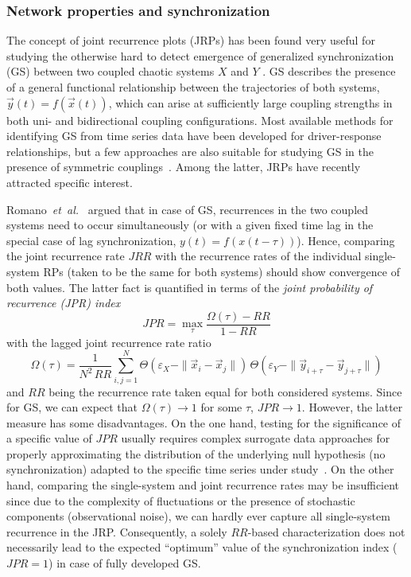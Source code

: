 		\subsubsection{Network properties and synchronization}\label{sec:JRNSsync}
		The concept of joint recurrence plots (JRPs) has been found very useful for studying the otherwise hard to detect emergence of generalized synchronization (GS) between two coupled chaotic systems $X$ and $Y$ \cite{romano2005}. GS describes the presence of a general functional relationship between the trajectories of both systems, $\vec{y}(t)=f(\vec{x}(t))$, which can arise at sufficiently large coupling strengths in both uni- and bidirectional coupling configurations. Most available methods for identifying GS from time series data have been developed for driver-response relationships, but a few approaches are also suitable for studying GS in the presence of symmetric couplings~\cite{Feldhoff2013}. Among the latter, JRPs have recently attracted specific interest.

		Romano~\textit{et~al.}~\cite{romano2005} argued that in case of GS, recurrences in the two coupled systems need to occur simultaneously (or with a given fixed time lag in the special case of lag synchronization, $y(t)=f(x(t-\tau))$). Hence, comparing the joint recurrence rate $JRR$ with the recurrence rates of the individual single-system RPs (taken to be the same for both systems) should show convergence of both values. The latter fact is quantified in terms of the \textit{joint probability of recurrence (JPR) index}
\begin{equation}
JPR = \max_{\tau} \frac{\Omega(\tau)-RR}{1-RR}
\label{eq:jpr}
\end{equation}
\noindent
with the lagged joint recurrence rate ratio
\begin{equation}
\Omega(\tau)=\frac{1}{N^2\, RR}\sum_{i,j=1}^N \Theta(\varepsilon_X-\|\vec{x}_i-\vec{x}_j\|)\, \Theta(\varepsilon_Y-\|\vec{y}_{i+\tau}-\vec{y}_{j+\tau}\|)
\end{equation}
\noindent
and $RR$ being the recurrence rate taken equal for both considered systems. Since for GS, we can expect that $\Omega(\tau)\to 1$ for some $\tau$, $JPR\to 1$. However, the latter measure has some disadvantages. On the one hand, testing for the significance of a specific value of $JPR$ usually requires complex surrogate data approaches for properly approximating the distribution of the underlying null hypothesis (no synchronization) adapted to the specific time series under study~\cite{thiel2006b}. On the other hand, comparing the single-system and joint recurrence rates may be insufficient since due to the complexity of fluctuations or the presence of stochastic components (observational noise), we can hardly ever capture all single-system recurrence in the JRP. Consequently, a solely $RR$-based characterization does not necessarily lead to the expected ``optimum'' value of the synchronization index ($JPR=1$) in case of fully developed GS.

